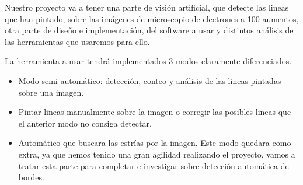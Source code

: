 Nuestro proyecto va a tener una parte de visión artificial, que detecte las lineas que han pintado, sobre las imágenes de microscopio de electrones a 100 aumentos, otra parte de diseño e implementación, del software a usar y distintos análisis de las herramientas que usaremos para ello.

La herramienta a usar tendrá implementados 3 modos claramente diferenciados.

\begin{itemize}
\item Modo semi-automático: detección, conteo y análisis de las lineas pintadas sobre una imagen.
\item Pintar lineas manualmente sobre la imagen o corregir las posibles lineas que el anterior modo no consiga detectar.
\item Automático que buscara las estrías por la imagen. Este modo quedara como extra, ya que hemos tenido una gran agilidad realizando el proyecto, vamos a tratar esta parte para completar e investigar sobre detección automática de bordes.
\end{itemize}








 